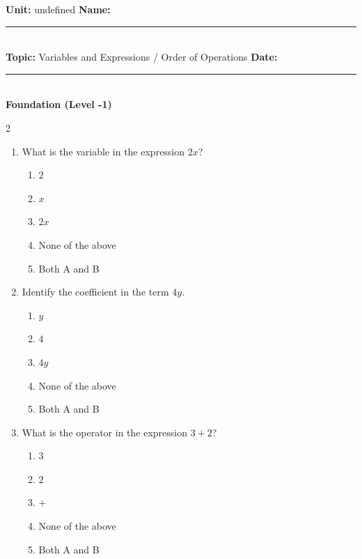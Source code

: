 \documentclass[10pt]{article}
\begin{document}
\enlargethispage{2.5cm}

\begin{tcolorbox}[colback=mainblue!5, colframe=mainblue, sharp corners, boxrule=0.5pt]
    \small \textbf{Unit:} undefined \hfill \textbf{Name:} \rule{3cm}{0.4pt} \\
    \small \textbf{Topic:} Variables and Expressions / Order of Operations \hfill \textbf{Date:} \rule{2cm}{0.4pt} \\
    \centering \textbf{\large Foundation (Level -1)}
\end{tcolorbox}

\vspace{0.2cm}

\begin{multicols}{2}
\begin{enumerate}[label=\textbf{Q\arabic*.}, leftmargin=*, itemsep=6pt, parsep=0pt]

  \item \small What is the variable in the expression $2x$?
  \begin{enumerate}[label=(\Alph*), leftmargin=0.6cm, nosep, itemsep=2pt]
    \item $2$
    \item $x$
    \item $2x$
    \item None of the above
    \item Both A and B
  \end{enumerate}

  \item \small Identify the coefficient in the term $4y$.
  \begin{enumerate}[label=(\Alph*), leftmargin=0.6cm, nosep, itemsep=2pt]
    \item $y$
    \item $4$
    \item $4y$
    \item None of the above
    \item Both A and B
  \end{enumerate}

  \item \small What is the operator in the expression $3 + 2$?
  \begin{enumerate}[label=(\Alph*), leftmargin=0.6cm, nosep, itemsep=2pt]
    \item $3$
    \item $2$
    \item $+$
    \item None of the above
    \item Both A and B
  \end{enumerate}


\end{enumerate}
\end{multicols}
\end{document}
